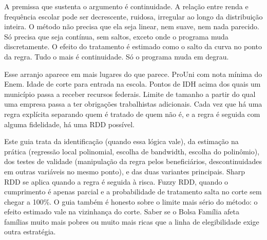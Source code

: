 \documentclass[12pt, a4paper, openany]{book}
\begin{document}
A premissa que sustenta o argumento é continuidade. A relação entre renda
e frequência escolar pode ser decrescente, ruidosa, irregular ao longo da
distribuição inteira. O método não precisa que ela seja linear, nem suave,
nem nada parecido. Só precisa que seja contínua, sem saltos, exceto onde o
programa muda discretamente. O efeito do tratamento é estimado como o
salto da curva no ponto da regra. Tudo o mais é continuidade. Só o
programa muda em degrau.

Esse arranjo aparece em mais lugares do que parece. ProUni com nota mínima
do Enem. Idade de corte para entrada na escola. Pontos de IDH acima dos
quais um município passa a receber recursos federais. Limite de tamanho a
partir do qual uma empresa passa a ter obrigações trabalhistas adicionais.
Cada vez que há uma regra explícita separando quem é tratado de quem não
é, e a regra é seguida com alguma fidelidade, há uma RDD possível.

Este guia trata da identificação (quando essa lógica vale), da estimação
na prática (regressão local polinomial, escolha de bandwidth, escolha do
polinômio), dos testes de validade (manipulação da regra pelos
beneficiários, descontinuidades em outras variáveis no mesmo ponto), e das
duas variantes principais. Sharp RDD se aplica quando a regra é seguida à
risca. Fuzzy RDD, quando o cumprimento é apenas parcial e a probabilidade
de tratamento salta no corte sem chegar a 100\%. O guia também é honesto
sobre o limite mais sério do método: o efeito estimado vale na vizinhança
do corte. Saber se o Bolsa Família afeta famílias muito mais pobres ou
muito mais ricas que a linha de elegibilidade exige outra estratégia.
\newpage

\thispagestyle{empty}
\end{document}
